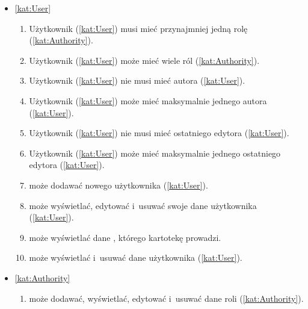 \begin{itemize}[label={\textbf{Reguły dla}}, wide, labelwidth=!, labelindent=0pt]
    \setlength\itemsep{1.75em}
    \item\ref{kat:User}\mynobreakpar
    \begin{enumerate}[label={\textbf{REG/1/\protect\twodigits{\arabic{enumi}}}}, wide, labelwidth=!, align=left, leftmargin=3cm]
        \item Użytkownik (\ref{kat:User}) musi mieć przynajmniej jedną rolę (\ref{kat:Authority}).
        \item Użytkownik (\ref{kat:User}) może mieć wiele ról (\ref{kat:Authority}).
        \item Użytkownik (\ref{kat:User}) nie musi mieć autora (\ref{kat:User}).
        \item Użytkownik (\ref{kat:User}) może mieć maksymalnie jednego autora (\ref{kat:User}).
        \item Użytkownik (\ref{kat:User}) nie musi mieć ostatniego edytora (\ref{kat:User}).
        \item Użytkownik (\ref{kat:User}) może mieć maksymalnie jednego ostatniego edytora (\ref{kat:User}).
        \item {} może dodawać nowego użytkownika (\ref{kat:User}).
        \item {} może wyświetlać, edytować i~usuwać swoje dane użytkownika (\ref{kat:User}).
        \item {} może wyświetlać dane , którego kartotekę prowadzi.
        \item {} może wyświetlać i~usuwać dane użytkownika (\ref{kat:User}).
    \end{enumerate}
    \item\ref{kat:Authority}\mynobreakpar
    \begin{enumerate}[label={\textbf{REG/1/\protect\twodigits{\arabic{enumi}}}}, wide, labelwidth=!, align=left, leftmargin=3cm, resume]
        \item {} może dodawać, wyświetlać, edytować i~usuwać dane roli (\ref{kat:Authority}).
    \end{enumerate}

\end{itemize}
